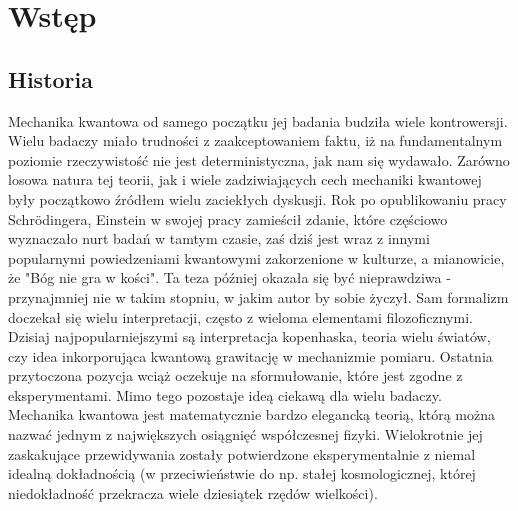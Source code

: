 \documentclass[10pt]{article} %
\begin{document}
\section{Wstęp}
\subsection{Historia}
Mechanika kwantowa od samego początku jej badania budziła wiele kontrowersji. Wielu badaczy miało trudności z zaakceptowaniem faktu, iż
na fundamentalnym poziomie rzeczywistość nie jest deterministyczna, jak nam się wydawało. Zarówno losowa natura tej teorii, jak i wiele zadziwiających cech mechaniki kwantowej były początkowo źródłem wielu zaciekłych dyskusji. Rok po opublikowaniu pracy Schrödingera, Einstein w swojej pracy zamieścił zdanie, które częściowo wyznaczało nurt badań w tamtym czasie, zaś dziś jest wraz z innymi popularnymi powiedzeniami kwantowymi zakorzenione w kulturze, a mianowicie, że "Bóg nie gra w kości". Ta teza później okazała się być nieprawdziwa - przynajmniej nie w takim stopniu, w jakim autor by sobie życzył. Sam formalizm doczekał się wielu interpretacji, często z wieloma elementami filozoficznymi. Dzisiaj najpopularniejszymi są interpretacja kopenhaska, teoria wielu światów, czy idea inkorporująca kwantową grawitację w mechanizmie pomiaru. Ostatnia przytoczona pozycja wciąż oczekuje na sformułowanie, które jest zgodne z eksperymentami. Mimo tego pozostaje ideą ciekawą dla wielu badaczy. Mechanika kwantowa jest matematycznie bardzo elegancką teorią, którą można nazwać jednym z największych osiągnięć współczesnej fizyki. Wielokrotnie jej zaskakujące przewidywania zostały potwierdzone eksperymentalnie z niemal idealną dokładnością (w przeciwieństwie do np. stałej kosmologicznej, której niedokładność przekracza wiele dziesiątek rzędów wielkości). 
\end{document}
